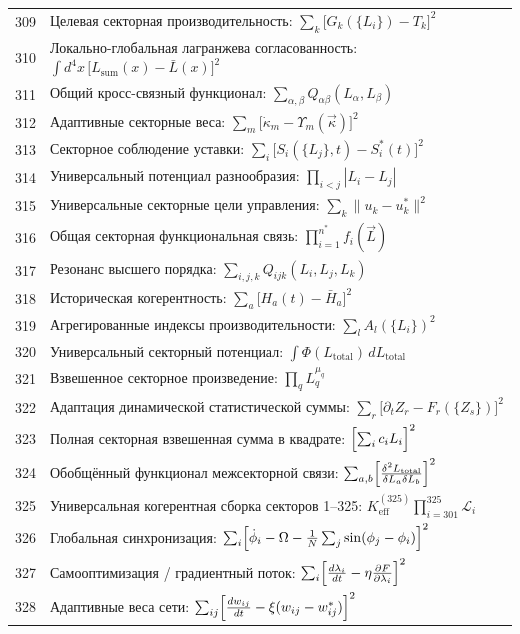 \documentclass[12pt,a4paper]{article}
\begin{document}
\begin{longtable}{r l}
		309 & Целевая секторная производительность: $\sum_k\bigl[G_k(\{L_i\}) - T_k\bigr]^2$ \\
		310 & Локально-глобальная лагранжева согласованность: $\int d^4x\,\bigl[L_{\text{sum}}(x) - \bar L(x)\bigr]^2$ \\
		311 & Общий кросс-связный функционал: $\sum_{\alpha,\beta}Q_{\alpha\beta}(L_\alpha,L_\beta)$ \\
		312 & Адаптивные секторные веса: $\sum_m\bigl[\dot\kappa_m - \Upsilon_m(\vec\kappa)\bigr]^2$ \\
		313 & Секторное соблюдение уставки: $\sum_i\bigl[S_i(\{L_j\},t) - S_i^*(t)\bigr]^2$ \\
		314 & Универсальный потенциал разнообразия: $\prod_{i<j}|L_i - L_j|$ \\
		315 & Универсальные секторные цели управления: $\sum_k\|u_k - u_k^*\|^2$ \\
		316 & Общая секторная функциональная связь: $\prod_{i=1}^{n^*}f_i(\vec L)$ \\
		317 & Резонанс высшего порядка: $\sum_{i,j,k}Q_{ijk}(L_i,L_j,L_k)$ \\
		318 & Историческая когерентность: $\sum_a\bigl[H_a(t) - \bar H_a\bigr]^2$ \\
		319 & Агрегированные индексы производительности: $\sum_l A_l(\{L_i\})^2$ \\
		320 & Универсальный секторный потенциал: $\int\Phi(L_{\text{total}})\,dL_{\text{total}}$ \\
		321 & Взвешенное секторное произведение: $\prod_q L_q^{\mu_q}$ \\
		322 & Адаптация динамической статистической суммы: $\sum_r\bigl[\partial_t Z_r - F_r(\{Z_s\})\bigr]^2$ \\
		323 & Полная секторная взвешенная сумма в квадрате: $\Bigl[\sum_i c_i L_i\Bigr]^2$ \\
		324 & Обобщённый функционал межсекторной связи: $\sum_{a,b}\Bigl[\frac{\delta^2 L_{\text{total}}}{\delta L_a\delta L_b}\Bigr]^2$ \\
		325 & Универсальная когерентная сборка секторов 1–325: $K^{(325)}_{\mathrm{eff}}\prod_{i=301}^{325}\mathcal{L}_i$ \\
		326 & Глобальная синхронизация: $\sum_i\Bigl[\dot\phi_i - \Omega - \frac1N\sum_j\sin(\phi_j-\phi_i)\Bigr]^2$ \\
		327 & Самооптимизация / градиентный поток: $\sum_i\Bigl[\frac{d\lambda_i}{dt} - \eta\frac{\partial F}{\partial\lambda_i}\Bigr]^2$ \\
		328 & Адаптивные веса сети: $\sum_{ij}\Bigl[\frac{dw_{ij}}{dt} - \xi(w_{ij}-w_{ij}^*)\Bigr]^2$ \\

\end{longtable}
\end{document}
